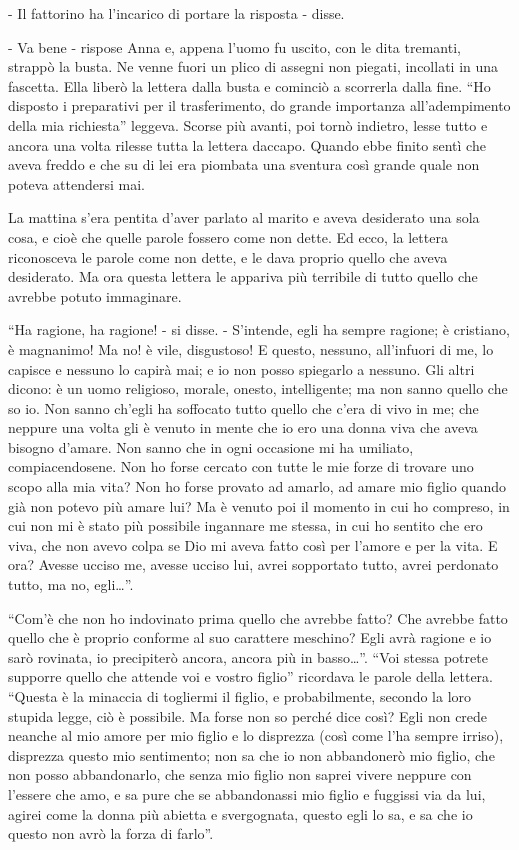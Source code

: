 - Il fattorino ha l'incarico di portare la risposta - disse. 

- Va bene - rispose Anna e, appena l'uomo fu uscito, con le dita tremanti, strappò la busta. Ne venne fuori un plico di assegni non piegati, incollati in una fascetta. Ella liberò la lettera dalla busta e cominciò a scorrerla dalla fine. ``Ho disposto i preparativi per il trasferimento, do grande importanza all'adempimento della mia richiesta'' leggeva. Scorse più avanti, poi tornò indietro, lesse tutto e ancora una volta rilesse tutta la lettera daccapo. Quando ebbe finito sentì che aveva freddo e che su di lei era piombata una sventura così grande quale non poteva attendersi mai. 

La mattina s'era pentita d'aver parlato al marito e aveva desiderato una sola cosa, e cioè che quelle parole fossero come non dette. Ed ecco, la lettera riconosceva le parole come non dette, e le dava proprio quello che aveva desiderato. Ma ora questa lettera le appariva più terribile di tutto quello che avrebbe potuto immaginare. 

``Ha ragione, ha ragione! - si disse. - S'intende, egli ha sempre ragione; è cristiano, è magnanimo! Ma no! è vile, disgustoso! E questo, nessuno, all'infuori di me, lo capisce e nessuno lo capirà mai; e io non posso spiegarlo a nessuno. Gli altri dicono: è un uomo religioso, morale, onesto, intelligente; ma non sanno quello che so io. Non sanno ch'egli ha soffocato tutto quello che c'era di vivo in me; che neppure una volta gli è venuto in mente che io ero una donna viva che aveva bisogno d'amare. Non sanno che in ogni occasione mi ha umiliato, compiacendosene. Non ho forse cercato con tutte le mie forze di trovare uno scopo alla mia vita? Non ho forse provato ad amarlo, ad amare mio figlio quando già non potevo più amare lui? Ma è venuto poi il momento in cui ho compreso, in cui non mi è stato più possibile ingannare me stessa, in cui ho sentito che ero viva, che non avevo colpa se Dio mi aveva fatto così per l'amore e per la vita. E ora? Avesse ucciso me, avesse ucciso lui, avrei sopportato tutto, avrei perdonato tutto, ma no, egli\ldots{}''. 

``Com'è che non ho indovinato prima quello che avrebbe fatto? Che avrebbe fatto quello che è proprio conforme al suo carattere meschino? Egli avrà ragione e io sarò rovinata, io precipiterò ancora, ancora più in basso\ldots{}''. ``Voi stessa potrete supporre quello che attende voi e vostro figlio'' ricordava le parole della lettera. ``Questa è la minaccia di togliermi il figlio, e probabilmente, secondo la loro stupida legge, ciò è possibile. Ma forse non so perché dice così? Egli non crede neanche al mio amore per mio figlio e lo disprezza (così come l'ha sempre irriso), disprezza questo mio sentimento; non sa che io non abbandonerò mio figlio, che non posso abbandonarlo, che senza mio figlio non saprei vivere neppure con l'essere che amo, e sa pure che se abbandonassi mio figlio e fuggissi via da lui, agirei come la donna più abietta e svergognata, questo egli lo sa, e sa che io questo non avrò la forza di farlo''. 

